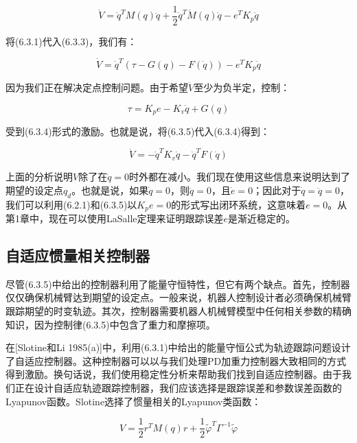 \documentclass[12pt,a4paper]{ctexart}
\begin{document}
\begin{equation}\label{eq:lyapunov-deriv2}
\dot{V} = \dot{q}^T M(q)\ddot{q} + \frac{1}{2}\dot{q}^T \dot{M}(q)\dot{q} - e^T K_p \dot{q}
\end{equation}

将(6.3.1)代入(6.3.3)，我们有：

\begin{equation}\label{eq:lyapunov-subst2}
\dot{V} = \dot{q}^T (\tau - G(q) - F(\dot{q})) - e^T K_p \dot{q}
\end{equation}

因为我们正在解决定点控制问题。由于希望$\dot{V}$至少为负半定，控制：

\begin{equation}\label{eq:pd-gravity}
\tau = K_p e - K_v \dot{q} + G(q)
\end{equation}

受到(6.3.4)形式的激励。也就是说，将(6.3.5)代入(6.3.4)得到：

\begin{equation}\label{eq:lyapunov-negative2}
\dot{V} = -\dot{q}^T K_v \dot{q} - \dot{q}^T F(\dot{q})
\end{equation}

上面的分析说明$V$除了在$\dot{q} = 0$时外都在减小。我们现在使用这些信息来说明达到了期望的设定点$q_d$。也就是说，如果$\dot{q} = 0$，则$\ddot{q} = 0$，且$\dot{e} = 0$；因此对于$\dot{q} = \ddot{q} = 0$，我们可以利用(6.2.1)和(6.3.5)以$K_p e = 0$的形式写出闭环系统，这意味着$e = 0$。从第1章中，现在可以使用LaSalle定理来证明跟踪误差$e$是渐近稳定的。

\subsection*{自适应惯量相关控制器}

尽管(6.3.5)中给出的控制器利用了能量守恒特性，但它有两个缺点。首先，控制器仅仅确保机械臂达到期望的设定点。一般来说，机器人控制设计者必须确保机械臂跟踪期望的时变轨迹。其次，控制器需要机器人机械臂模型中任何相关参数的精确知识，因为控制律(6.3.5)中包含了重力和摩擦项。

在[Slotine和Li 1985(a)]中，利用(6.3.1)中给出的能量守恒公式为轨迹跟踪问题设计了自适应控制器。这种控制器可以以与我们处理PD加重力控制器大致相同的方式得到激励。换句话说，我们使用稳定性分析来帮助我们找到自适应控制器。由于我们正在设计自适应轨迹跟踪控制器，我们应该选择是跟踪误差和参数误差函数的Lyapunov函数。Slotine选择了惯量相关的Lyapunov类函数：

\begin{equation}\label{eq:slotine-lyapunov}
V = \frac{1}{2}r^T M(q) r + \frac{1}{2}\tilde{\varphi}^T \Gamma^{-1} \tilde{\varphi}
\end{equation}
\end{document}
